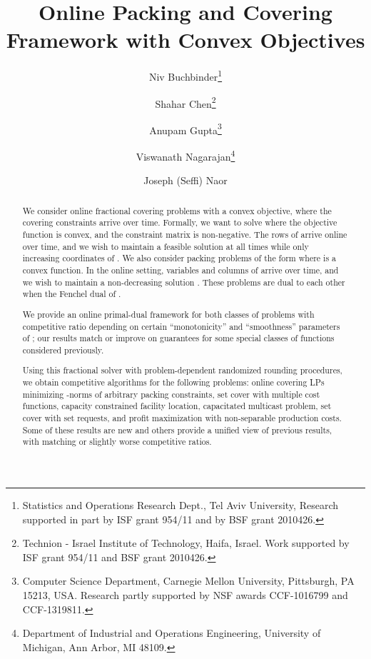 \documentclass[letterpaper,11pt]{article}
\date{}
\begin{document}
\title{Online Packing and Covering Framework with Convex Objectives}
\date{}
\author{Niv Buchbinder\thanks{Statistics and Operations Research Dept., Tel Aviv University, Research supported in part by ISF grant
954/11 and by BSF grant 2010426.}
\and
Shahar Chen\thanks{Technion - Israel Institute of Technology, Haifa, Israel. Work
supported by ISF grant 954/11 and BSF grant 2010426.}
\and
Anupam Gupta\thanks{Computer Science Department, Carnegie Mellon
    University, Pittsburgh, PA 15213, USA. Research partly supported by
    NSF awards CCF-1016799 and CCF-1319811.}
\and
Viswanath Nagarajan\thanks{Department of Industrial and Operations
  Engineering, University of Michigan, Ann Arbor, MI 48109.}
\and
Joseph (Seffi) Naor}


\maketitle
\begin{abstract}
  We consider online fractional covering problems with a convex
  objective, where the covering constraints arrive over time. Formally,
  we want to solve
   where the
  objective function  is convex, and the
  constraint matrix  is non-negative. The rows of 
  arrive online over time, and we wish to maintain a feasible solution
   at all times while only increasing coordinates of .  We also
  consider packing problems of the form
   where  is a convex function. In the online setting,
  variables  and columns of  arrive over time, and we wish
  to maintain a non-decreasing solution . These problems are dual to each other when  the Fenchel
  dual of .

  \medskip We provide an online primal-dual framework for both classes
  of problems with competitive ratio depending on certain
  ``monotonicity'' and ``smoothness'' parameters of ; our results
  match or improve on guarantees for some special classes of
  functions  considered previously.


  \medskip Using this fractional solver  with problem-dependent
  randomized rounding procedures, we obtain competitive algorithms for
  the following problems: online covering LPs minimizing -norms
  of arbitrary packing constraints, set cover with multiple cost
  functions, capacity constrained facility location, capacitated
  multicast problem, set cover with set requests, and profit maximization with non-separable production costs. Some of these
  results are new and others provide a unified view of previous results,
  with matching or slightly worse competitive ratios.
\end{abstract}
\end{document}
